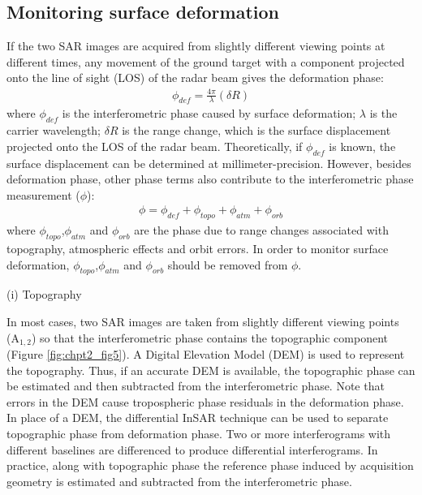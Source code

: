 \subsection{Monitoring surface deformation}
If the two SAR images are acquired from slightly different viewing points at different times, any movement of the ground target with a component projected onto the line of sight (LOS) of the radar beam gives the deformation phase: 
\begin{equation} \label{eq:chpt2_eq4}
\begin{aligned}
\phi_{def}=\frac{4 \pi}{\lambda}(\delta R)
\end{aligned}
\end{equation}
where $\phi_{def}$ is the interferometric phase caused by surface deformation; $\lambda$ is the carrier wavelength; $\delta R$ is the range change, which is the surface displacement projected onto the LOS of the radar beam.  Theoretically, if $\phi_{def}$ is known, the surface displacement can be determined at millimeter-precision.  However, besides deformation phase, other phase terms also contribute to the interferometric phase measurement ($\phi$):
\begin{equation} \label{eq:chpt2_eq5}
\begin{aligned}
\phi= \phi_{def} + \phi_{topo} + \phi_{atm} + \phi_{orb}
\end{aligned}
\end{equation}
where $\phi_{topo}$,$\phi_{atm}$ and $\phi_{orb}$ are the phase due to range changes associated with topography, atmospheric effects and orbit errors.  In order to monitor surface deformation, $\phi_{topo}$,$\phi_{atm}$ and $\phi_{orb}$ should be removed from $\phi$.

(i) Topography
 
In most cases, two SAR images are taken from slightly different viewing points (A$_{1,2}$) so that the interferometric phase contains the topographic component (Figure \ref{fig:chpt2_fig5}).  A Digital Elevation Model (DEM) is used to represent the topography. Thus, if an accurate DEM is available, the topographic phase can be estimated and then subtracted from the interferometric phase.  Note that errors in the DEM cause tropospheric phase residuals in the deformation phase.  In place of a DEM, the differential InSAR technique can be used to separate topographic phase from deformation phase.  Two or more interferograms with different baselines are differenced to produce differential interferograms.  In practice, along with topographic phase the reference phase induced by acquisition geometry is estimated and subtracted from the interferometric phase. 

